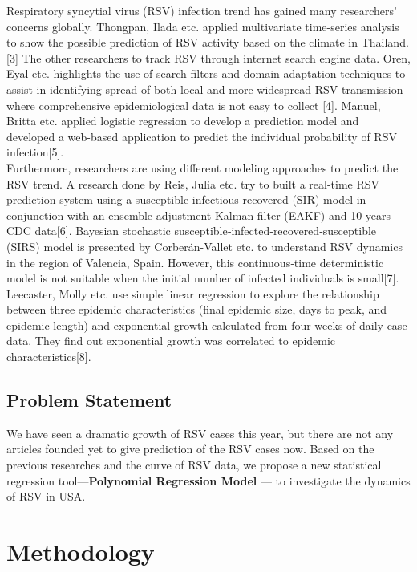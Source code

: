 \documentclass[
  letterpaper,
  DIV=11,
  numbers=noendperiod]{scrreport}
\begin{document}
Respiratory syncytial virus (RSV) infection trend has gained many
researchers' concerns globally. Thongpan, Ilada etc. applied
multivariate time-series analysis to show the possible prediction of RSV
activity based on the climate in Thailand. {[}3{]} The other researchers
to track RSV through internet search engine data. Oren, Eyal etc.
highlights the use of search filters and domain adaptation techniques to
assist in identifying spread of both local and more widespread RSV
transmission where comprehensive epidemiological data is not easy to
collect {[}4{]}. Manuel, Britta etc. applied logistic regression to
develop a prediction model and developed a web-based application to
predict the individual probability of RSV infection{[}5{]}.\\
Furthermore, researchers are using different modeling approaches to
predict the RSV trend. A research done by Reis, Julia etc. try to built
a real-time RSV prediction system using a
susceptible-infectious-recovered (SIR) model in conjunction with an
ensemble adjustment Kalman filter (EAKF) and 10 years CDC data{[}6{]}.
Bayesian stochastic susceptible‐infected‐recovered‐susceptible (SIRS)
model is presented by Corberán-Vallet etc. to understand RSV dynamics in
the region of Valencia, Spain. However, this continuous‐time
deterministic model is not suitable when the initial number of infected
individuals is small{[}7{]}. Leecaster, Molly etc. use simple linear
regression to explore the relationship between three epidemic
characteristics (final epidemic size, days to peak, and epidemic length)
and exponential growth calculated from four weeks of daily case data.
They find out exponential growth was correlated to epidemic
characteristics{[}8{]}.

\hypertarget{problem-statement}{%
\section{Problem Statement}\label{problem-statement}}

We have seen a dramatic growth of RSV cases this year, but there are not
any articles founded yet to give prediction of the RSV cases now. Based
on the previous researches and the curve of RSV data, we propose a new
statistical regression tool---\textbf{Polynomial Regression Model} ---
to investigate the dynamics of RSV in USA.


\hypertarget{methodology}{%
\chapter{Methodology}\label{methodology}}
\end{document}
